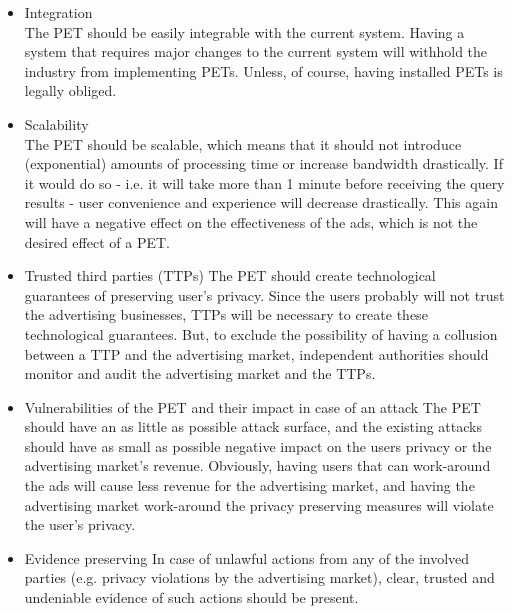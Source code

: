\documentclass[11pt]{article}
\newcommand{\tocheck}[1]{{\bf !?: #1 :!?}}
\newcommand{\oba}{online behavioural advertising }
\begin{document}
\begin{itemize}
	\item Integration\\
		The PET should be easily integrable with the current system. Having a system that requires major changes to the current system will withhold the industry from implementing PETs. Unless, of course, having installed PETs is legally obliged.

	\item Scalability\\
		The PET should be scalable, which means that it should not introduce (exponential) amounts of processing time or increase bandwidth drastically. If it would do so - i.e. it will take more than 1 minute before receiving the query results - user convenience and experience will decrease drastically. This again will have a negative effect on the effectiveness of the ads, which is not the desired effect of a PET.

	\item Trusted third parties (TTPs)
		The PET should create technological guarantees of preserving user's privacy. Since the users probably will not trust the advertising businesses, TTPs will be necessary to create these technological guarantees. But, to exclude the possibility of having a collusion between a TTP and the advertising market, independent authorities should monitor and audit the advertising market and the TTPs.

	\item Vulnerabilities of the PET and their impact in case of an attack
		The PET should have an as little as possible attack surface, and the existing attacks should have as small as possible negative impact on the users privacy or the advertising market's revenue. Obviously, having users that can work-around the ads will cause less revenue for the advertising market, and having the advertising market work-around the privacy preserving measures will violate the user's privacy.

	\item Evidence preserving
		In case of unlawful actions from any of the involved parties (e.g. privacy violations by the advertising market), clear, trusted and undeniable evidence of such actions should be present. 
\end{itemize}





\end{document}
